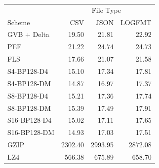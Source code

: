 \begin{tabular}{lrrr}
\toprule
 & \multicolumn{3}{c}{File Type} \\
Scheme & CSV & JSON & LOGFMT \\
\midrule
GVB + Delta & 19.50 & 21.81 & 22.92 \\
PEF & 21.22 & 24.74 & 24.73 \\
FLS & 17.66 & 21.07 & 21.58 \\
S4-BP128-D4 & 15.10 & 17.34 & 17.81 \\
S4-BP128-DM & 14.87 & 16.97 & 17.37 \\
S8-BP128-D4 & 15.21 & 17.36 & 17.74 \\
S8-BP128-DM & 15.39 & 17.49 & 17.91 \\
S16-BP128-D4 & 15.02 & 17.11 & 17.65 \\
S16-BP128-DM & 14.93 & 17.03 & 17.51 \\
GZIP & 2302.40 & 2993.95 & 2872.08 \\
LZ4 & 566.38 & 675.89 & 658.70 \\
\bottomrule
\end{tabular}
